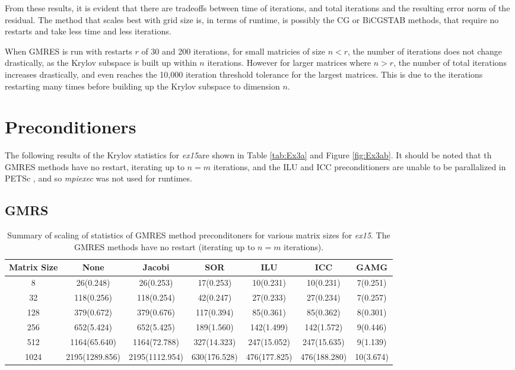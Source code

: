 \documentclass[12pt,letterpaper]{article}
\newcommand{\exe}{PETSc }
\newcommand{\program}{\textit{ex15}}
\begin{document}
From these results, it is evident that there are tradeoffs between time of iterations, and total iterations and the resulting error norm of the residual. The method that scales best with grid size is, in terms of runtime, is possibly the CG or BiCGSTAB methods, that require no restarts and take less time and less iterations.

When GMRES is run with restarts $r$ of 30 and 200 iterations, for small matricies of size $n<r$, the number of iterations does not change drastically, as the Krylov subspace is built up within $n$ iterations. However for larger matrices where $n>r$, the number of total iterations increases drastically, and even reaches the 10,000 iteration threshold tolerance for the largest matrices. This is due to the iterations restarting many times before building up the Krylov subspace to dimension $n$.


\section{Preconditioners}

The following results of the Krylov statistics for \program are shown in Table \ref{tab:Ex3a} and Figure \ref{fig:Ex3ab}. It should be noted that th GMRES methods have no restart, iterating up to $n=m$ iterations, and the ILU and ICC preconditioners are unable to be parallalized in \exe, and so \textit{mpiexec} was not used for runtimes.

\subsection{GMRS}
\begin{table}[htb!]
    \centering
    \caption{Summary of scaling of statistics of GMRES method preconditoners for various matrix sizes for \program. The GMRES methods have no restart (iterating up to $n=m$ iterations).}
    \label{tab:Ex3a_gmres}
    \begin{tabular}{|c|c|c|c|c|c|c|} \hline
        Matrix Size & None & Jacobi & SOR & ILU & ICC & GAMG \\ \hline
        8     &     26(0.248)   &      26(0.253)  &    17(0.253)  &    10(0.231)   &   10(0.231)   &    7(0.251)  \\ \hline
        32    &     118(0.256)   &      118(0.254)  &    42(0.247) &    27(0.233)   &   27(0.234)   &    7(0.257) \\ \hline
        128   &     379(0.672)   &     379(0.676)   &   117(0.394)   &   85(0.361)    &  85(0.362)    &   8(0.301) \\ \hline
        256   &     652(5.424)   &      652(5.425)  &    189(1.560)  &    142(1.499)   &   142(1.572)   &    9(0.446) \\ \hline
        512   &    1164(65.640)   &     1164(72.788)  &   327(14.323)  &   247(15.052)   &  247(15.635)   &    9(1.139) \\ \hline
        1024  &  2195(1289.856)   &   2195(1112.954)  &  630(176.528)  &  476(177.825)   & 476(188.280)   &    10(3.674) \\ \hline
    \end{tabular}
\end{table}
\end{document}
